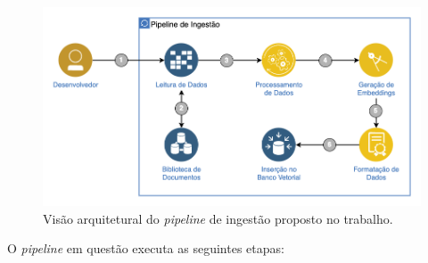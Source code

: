 \documentclass[a4paper, 12pt]{article}
\begin{document}
    \begin{figure}[ht]
        \includegraphics[width=\textwidth,height=0.9\textheight,keepaspectratio]{architecture-pipeline.png}
        \centering
        \caption{Visão arquitetural do \textit{pipeline} de ingestão proposto no trabalho.}
        \centering
        \label{fig:pipeline_scheme}
    \end{figure}
    
    O \textit{pipeline} em questão executa as seguintes etapas: 
    
\end{document}
